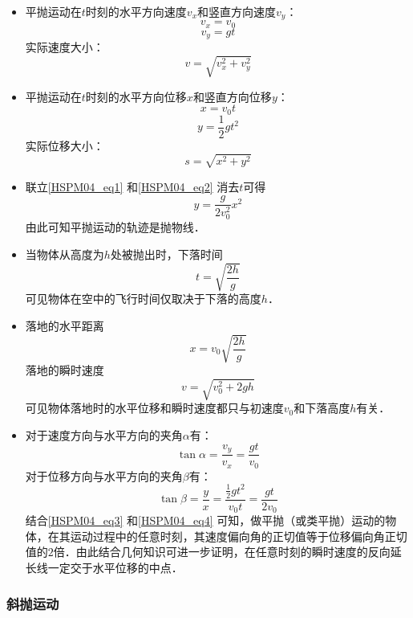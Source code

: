 \begin{itemize}
\item 平抛运动在$t$时刻的水平方向速度$v_x$和竖直方向速度$v_y$：
\begin{equation}
v_x=v_0
\end{equation}
\begin{equation}
v_y=gt
\end{equation}
实际速度大小：
\begin{equation}
v=\sqrt{v_x^2+v_y^2}
\end{equation}

\item 平抛运动在$t$时刻的水平方向位移$x$和竖直方向位移$y$：
\begin{equation}\label{HSPM04_eq1}
x=v_0t
\end{equation}
\begin{equation}\label{HSPM04_eq2}
y=\frac12 gt^2
\end{equation}
实际位移大小：
\begin{equation}
s=\sqrt{x^2+y^2}
\end{equation}

\item 联立\autoref{HSPM04_eq1} 和\autoref{HSPM04_eq2} 消去$t$可得
\begin{equation}
y=\frac{g}{2v_0^2}x^2
\end{equation}
由此可知平抛运动的轨迹是抛物线．

\item 当物体从高度为$h$处被抛出时，下落时间
\begin{equation}\label{HSPM04_eq5}
t=\sqrt{\frac{2h}{g}}
\end{equation}
可见物体在空中的飞行时间仅取决于下落的高度$h$．

\item 落地的水平距离
\begin{equation}
x=v_0\sqrt{\frac{2h}{g}}
\end{equation}
落地的瞬时速度
\begin{equation}
v=\sqrt{v_0^2+2gh}
\end{equation}
可见物体落地时的水平位移和瞬时速度都只与初速度$v_0$和下落高度$h$有关．

\item 对于速度方向与水平方向的夹角$\alpha$有：
\begin{equation}\label{HSPM04_eq3}
\tan \alpha = \frac {v_y}{v_x}=\frac{gt}{v_0}
\end{equation}
对于位移方向与水平方向的夹角$\beta$有：
\begin{equation}\label{HSPM04_eq4}
\tan \beta = \frac{y}{x}=\frac{\frac12 gt^2}{v_0t} = \frac{gt}{2v_0}
\end{equation}
结合\autoref{HSPM04_eq3} 和\autoref{HSPM04_eq4} 可知，做平抛（或类平抛）运动的物体，在其运动过程中的任意时刻，其速度偏向角的正切值等于位移偏向角正切值的$2$倍．由此结合几何知识可进一步证明，在任意时刻的瞬时速度的反向延长线一定交于水平位移的中点．
\end{itemize}
\subsubsection{斜抛运动}
